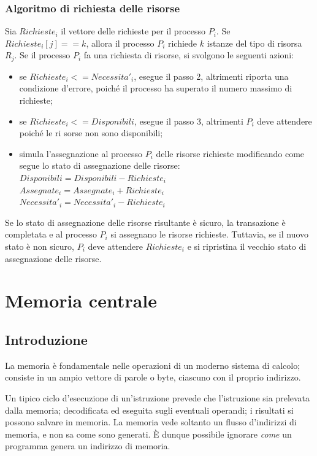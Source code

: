 \documentclass[11pt,a4paper]{article}
\begin{document}
\subsubsection{Algoritmo di richiesta delle risorse}
Sia $Richieste_i$ il vettore delle richieste per il processo $P_i$. Se $Richieste_i[j]==k$, allora il
processo $P_i$ richiede $k$ istanze del tipo di risorsa $R_j$. Se il processo $P_i$ fa una richiesta di risor­se, si svolgono le seguenti azioni:
\begin{itemize}[leftmargin=*]
  \item se $Richieste_i <= Necessita'_i$, esegue il passo 2, altrimenti riporta una condizione d'errore,
  poiché il processo ha superato il numero massimo di richieste;
  \item se $Richieste_i <= Disponibili$, esegue il passo 3, altrimenti $P_i$ deve attendere poiché le ri­  sorse non sono disponibili;
  \item simula l'assegnazione al processo $P_i$ delle risorse richieste modificando come segue lo
  stato di assegnazione delle risorse:\\
  $Disponibili = Disponibili - Richieste_i$\\
  $Assegnate_i = Assegnate_i + Richieste_i$\\
  $Necessita'_i = Necessita'_i - Richieste_i$
\end{itemize}
Se lo stato di assegnazione delle risorse risultante è sicuro, la transazione è completata
e al processo $P_i$ si assegnano le risorse richieste. Tuttavia, se il nuovo stato è non sicuro,
$P_i$ deve attendere $Richieste_i$ e si ripristina il vecchio stato di assegnazione delle risorse.

\section{Memoria centrale}
\subsection{Introduzione}
La memoria è fondamentale nelle operazioni di un moderno sistema di calcolo; consiste in un ampio vettore di parole o byte, ciascuno con il pro­prio indirizzo.

Un tipico ciclo d'esecuzione di un'istruzione prevede che l'istruzione sia
prelevata dalla memoria; decodificata ed eseguita sugli eventuali operandi; i risultati si possono salvare in memoria. La
memoria vede soltanto un flusso d'indirizzi di memoria, e non sa come sono generati. È dunque possibile ignorare \emph{come}
un programma genera un indirizzo di memoria.
\end{document}

